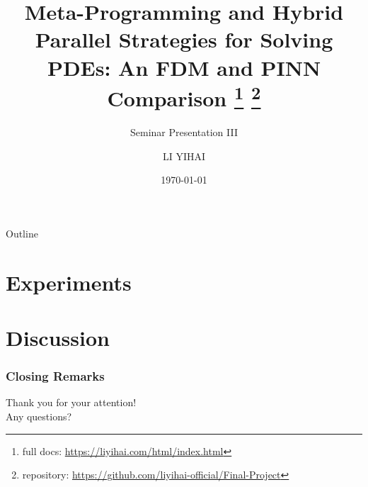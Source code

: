 \documentclass{my-Presentation}
\title[An FDM and PINN Comparison]{
  Meta-Programming and Hybrid Parallel Strategies for Solving PDEs: An FDM and PINN Comparison
  \footnote{full docs: \url{https://liyihai.com/html/index.html}}
  \footnote{repository: \url{https://github.com/liyihai-official/Final-Project}}
}
\subtitle{Seminar Presentation III}
\author[LI Yihai]{
  \normalsize
  LI YIHAI \\[1ex]
  \vspace*{-.5em}
}
\institute[Mathematics Institute]{
  Student ID: 23345919 \\[1ex]
  Supervision: Michael Peardon
}
\date{\today \vspace*{-1em}}
\begin{document}
\begin{frame}
  \titlepage
\end{frame}

\begin{frame}{Outline}
  \begin{multicols}{2}
    \tableofcontents
  \end{multicols}
\end{frame}





\section{Experiments}
\section{Discussion}

\begin{frame}
  \frametitle{Closing Remarks}
  \centering
  {\Large Thank you for your attention!}\\
  \vspace{2em}
  {\large Any questions?}
\end{frame}


\end{document}
